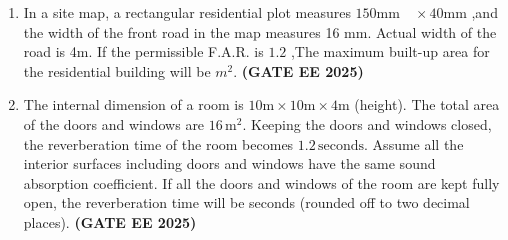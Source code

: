 \documentclass[journal,12pt,onecolumn]{IEEEtran}
\theoremstyle{remark}
\begin{document}
\begin{enumerate}
 \item In a site map, a rectangular residential plot measures $150\text{mm} \quad \times 40\text{mm}$ ,and the width of the front road in the map measures 16 mm. Actual width of the road is 4m. If the permissible F.A.R. is $1.2$ ,The maximum built-up area for the residential building will be \underline{\makebox[2cm]{\hfill}} $m^2$. \hfill \textbf{(GATE EE 2025)}
\item The internal dimension of a room is $10 \text{m} \times 10  \text{m} \times 4 \text{m}$ (height).  
The total area of the doors and windows are $16 \, \text{m}^2$. Keeping the doors and windows closed, 
the reverberation time of the room becomes $1.2 \, \text{seconds}$.  
Assume all the interior surfaces including doors and windows have the same sound absorption coefficient.  
If all the doors and windows of the room are kept fully open, the reverberation time will be 
\underline{\makebox[2cm]{\hfill}} seconds (rounded off to two decimal places). \hfill \textbf{(GATE EE 2025)}


\end{enumerate}
\end{document}
